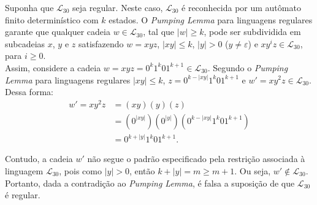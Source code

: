 \documentclass[12pt]{article}
\def\myling{{30}} %
\begin{document}
%
\begin{tcolorbox}[rounded corners, colback=yellow!5, colframe=red!40!black]
Suponha que $\mathcal{L}_{\myling}$ seja regular. Neste caso, $\mathcal{L}_{\myling}$ é reconhecida por um autômato finito determinístico com $k$ estados. O \emph{Pumping Lemma} para linguagens regulares garante que qualquer cadeia $w\in \mathcal{L}_{\myling}$, tal que $|w|\geqslant k$, pode ser subdividida em subcadeias $x$, $y$ e $z$ satisfazendo $w=xyz$, $|xy|\leqslant k$, $|y|>0$ ($y\neq\varepsilon$) e $xy^iz\in \mathcal{L}_{\myling}$, para $i\geqslant 0$.\\

Assim, considere a cadeia $w=xyz=0^k1^k01^{k+1}\in \mathcal{L}_{\myling}$. Segundo o \emph{Pumping Lemma} para linguagens regulares $|xy|\leqslant k$, $z=0^{k-|xy|}1^k01^{k+1}$ e $w'= xy^2z\in \mathcal{L}_{\myling}$. Dessa forma:
\begin{align*}
 w' = xy^2z &= (xy)(y)(z)\\
            &= (0^{|xy|})(0^{|y|})(0^{k-|xy|}1^k01^{k+1})\\
            &= 0^{k+|y|}1^k01^{k+1}.
\end{align*}

Contudo, a cadeia $w'$ não segue o padrão especificado pela restrição associada à linguagem $\mathcal{L}_{\myling}$, pois como $|y| > 0$, então $k+|y| = m \geqslant m+1$. Ou seja, $w'\notin\mathcal{L}_{\myling}$. Portanto, dada a contradição ao \emph{Pumping Lemma}, é falsa a suposição de que $\mathcal{L}_{\myling}$ é regular.
\end{tcolorbox}
%
\end{document}
